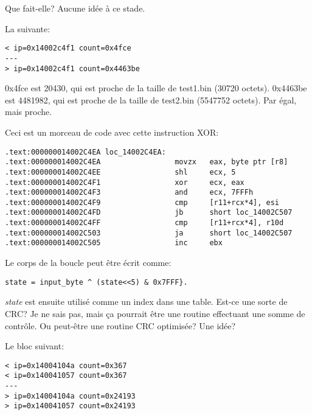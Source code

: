 Que fait-elle? Aucune idée à ce stade.

La suivante:

\begin{lstlisting}
< ip=0x14002c4f1 count=0x4fce
---
> ip=0x14002c4f1 count=0x4463be
\end{lstlisting}

0x4fce est 20430, qui est proche de la taille de test1.bin (30720 octets).
0x4463be est 4481982, qui est proche de la taille de test2.bin (5547752 octets).
Par égal, mais proche.

Ceci est un morceau de code avec cette instruction XOR:

\begin{lstlisting}
.text:000000014002C4EA loc_14002C4EA:
.text:000000014002C4EA                 movzx   eax, byte ptr [r8]
.text:000000014002C4EE                 shl     ecx, 5
.text:000000014002C4F1                 xor     ecx, eax
.text:000000014002C4F3                 and     ecx, 7FFFh
.text:000000014002C4F9                 cmp     [r11+rcx*4], esi
.text:000000014002C4FD                 jb      short loc_14002C507
.text:000000014002C4FF                 cmp     [r11+rcx*4], r10d
.text:000000014002C503                 ja      short loc_14002C507
.text:000000014002C505                 inc     ebx
\end{lstlisting}

Le corps de la boucle peut être écrit comme:

\begin{lstlisting}
state = input_byte ^ (state<<5) & 0x7FFF}.
\end{lstlisting}

\emph{state} est ensuite utilisé comme un index dans une table. Est-ce une sorte de \ac{CRC}?
Je ne sais pas, mais ça pourrait être une routine effectuant une somme de contrôle.
Ou peut-être une routine \ac{CRC} optimisée?
Une idée?

Le bloc suivant:

\begin{lstlisting}
< ip=0x14004104a count=0x367
< ip=0x140041057 count=0x367
---
> ip=0x14004104a count=0x24193
> ip=0x140041057 count=0x24193
\end{lstlisting}


